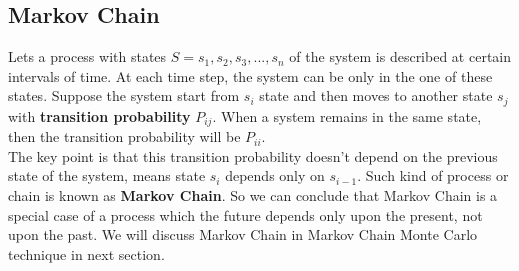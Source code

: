 \documentclass[12pt]{report}
\begin{document}
  \subsection{Markov Chain}
  Lets a process with states $S=s_1, s_2, s_3, . . ., s_n$ of the system is described at certain intervals of time. At each time step, the system can be only in the one of these states. Suppose the system start from $s_i$ state and then moves to another state $s_j$ with \textbf{transition probability} $P_{ij}$. When a system remains in the same state, then the transition probability will be $P_{ii}$. \\
  The key point is that this transition probability doesn't depend on the previous state of the system, means state $s_i$ depends only on $s_{i-1}$. Such kind of process or chain is known  as \textbf{Markov Chain}. So we can conclude that Markov Chain is a special case of a process which the future depends only upon the present, not upon the past. We will discuss Markov Chain in Markov Chain Monte Carlo technique in next section. \\
\end{document}
